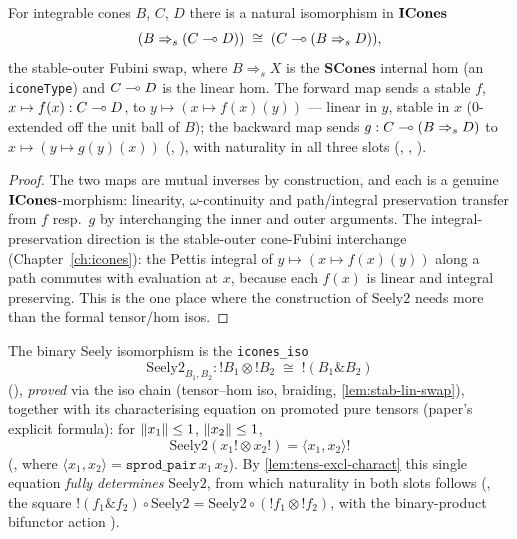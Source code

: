 \begin{lemma}\label{lem:stab-lin-swap}
\rocqok
{}
For integrable cones $B$, $C$, $D$ there is a natural isomorphism in
$\mathbf{ICones}$
\[
  (B \Rightarrow_s (C \multimap D)) \;\cong\; (C \multimap (B \Rightarrow_s D)),
\]
the stable-outer Fubini swap, where $B \Rightarrow_s X$ is the
$\mathbf{SCones}$ internal hom (an \texttt{iconeType}) and $C \multimap D$ is
the linear hom. The forward map sends a stable $f$, $x \mapsto f(x) : C
\multimap D$, to $y \mapsto (x \mapsto f(x)(y))$ --- linear in $y$, stable in
$x$ ($0$-extended off the unit ball of $B$); the backward map sends $g :
C \multimap (B \Rightarrow_s D)$ to $x \mapsto (y \mapsto g(y)(x))$
(,
), with
naturality in all three slots
(,
,
).
\end{lemma}

\begin{proof}
The two maps are mutual inverses by construction, and each is a genuine
$\mathbf{ICones}$-morphism: linearity, $\omega$-continuity and path/integral
preservation transfer from $f$ resp.\ $g$ by interchanging the inner and
outer arguments. The integral-preservation direction is the
stable-outer cone-Fubini interchange (Chapter~\ref{ch:icones}): the
Pettis integral of $y \mapsto (x \mapsto f(x)(y))$ along a path commutes
with evaluation at $x$, because each $f(x)$ is linear and integral
preserving. This is the one place where the construction of
$\mathrm{Seely2}$ needs more than the formal tensor/hom isos.
\end{proof}

\begin{definition}\label{def:seely2}
\rocqok{}
\rocqok{}
The binary Seely isomorphism is the \texttt{icones\_iso}
\[
  \mathrm{Seely2}_{B_1,B_2} : \mathord{!}B_1 \otimes \mathord{!}B_2
  \;\cong\; \mathord{!}(B_1 \mathbin{\&} B_2)
\]
(), \emph{proved} via the iso chain
(tensor--hom iso, braiding, \autoref{lem:stab-lin-swap}), together with
its characterising equation on promoted pure tensors (paper's explicit
formula): for $\lVert x_1 \rVert \leq 1$, $\lVert x_2 \rVert \leq 1$,
\[
  \mathrm{Seely2}(x_1! \otimes x_2!) = \langle x_1, x_2 \rangle!
\]
(, where $\langle x_1, x_2
\rangle = \texttt{sprod\_pair}\,x_1\,x_2$). By
\autoref{lem:tens-excl-charact} this single equation \emph{fully
determines} $\mathrm{Seely2}$, from which naturality in both slots
follows
(, the square
$\mathord{!}(f_1 \mathbin{\&} f_2) \circ \mathrm{Seely2} = \mathrm{Seely2}
\circ (\mathord{!}f_1 \otimes \mathord{!}f_2)$, with the binary-product
bifunctor action ).
\end{definition}

